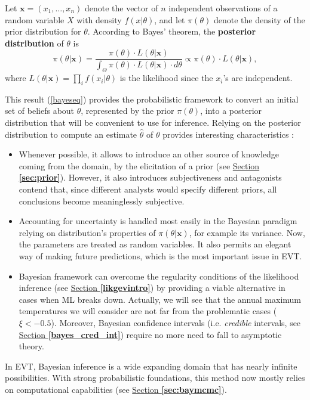 \begin{definition}
	Let $\boldsymbol{x}=(x_1,\dots,x_n)$
	denote the vector of $n$ independent observations of a random variable $X$ with density $f(x|\theta)$, and let $\pi(\theta)$ denote the density of the prior distribution for $\theta$. According to Bayes' theorem, the \textbf{posterior distribution} of $\theta$ is 
	\begin{equation}\label{bayeseq}
	\pi (\theta|\boldsymbol{x})=\frac{\pi(\theta)\cdot L(\theta|\boldsymbol{x})}{\int_{\Theta} 
		\pi(\theta)\cdot L(\theta|\boldsymbol{x}) \cdot d\theta}\propto \pi(\theta)\cdot 
	L(\theta|\boldsymbol{x}),
	\end{equation}
	where $L(\theta|\boldsymbol{x})=\prod_i f(x_i|\theta)$ is the likelihood since the $x_i$'s are independent.
\end{definition}
This result (\ref{bayeseq}) provides the probabilistic framework to convert an initial set of beliefs about $\theta$, represented by the prior $\pi(\theta)$, into a posterior distribution that will be convenient to use for inference.
Relying on the posterior distribution to compute an estimate $\hat{\theta}$ of $\theta$ provides interesting characteristics :
\begin{itemize}
	\item Whenever possible, it allows to introduce an other source of knowledge coming from the domain, by the elicitation of a prior (see \hyperref[sec:prior]{Section \textbf{\ref{sec:prior}}}). However, it also introduces subjectiveness and antagonists contend that, since different analysts would specify
	different priors, all conclusions become meaninglessly subjective.
	
	\item\label{it2bayes} Accounting for  uncertainty is handled most easily in the
	Bayesian paradigm relying on distribution's properties of $\pi(\theta|\boldsymbol{x})$, for example its variance. Now, the parameters are treated as random variables. %
	 It also permits an elegant way of making future predictions, which is the most important issue in EVT.
	
	\item Bayesian framework can overcome the regularity conditions of the likelihood inference
	(see \hyperref[likgevintro]{Section \textbf{\ref{likgevintro}}}) by providing a viable alternative in cases when ML breaks down. Actually, we will see that the annual maximum temperatures we will consider are not far from the problematic cases ($\xi<-0.5$). 
	Moreover, Bayesian confidence intervals (i.e. \emph{credible} intervals, see \hyperref[bayes_cred_int]{Section \textbf{\ref{bayes_cred_int}}}) require no more need to fall to asymptotic theory.
\end{itemize}
In EVT, Bayesian inference is a wide expanding domain that has nearly infinite possibilities.
With strong probabilistic foundations, this method now mostly relies on computational capabilities (see \hyperref[sec:baymcmc]{Section \textbf{\ref{sec:baymcmc}}}).


